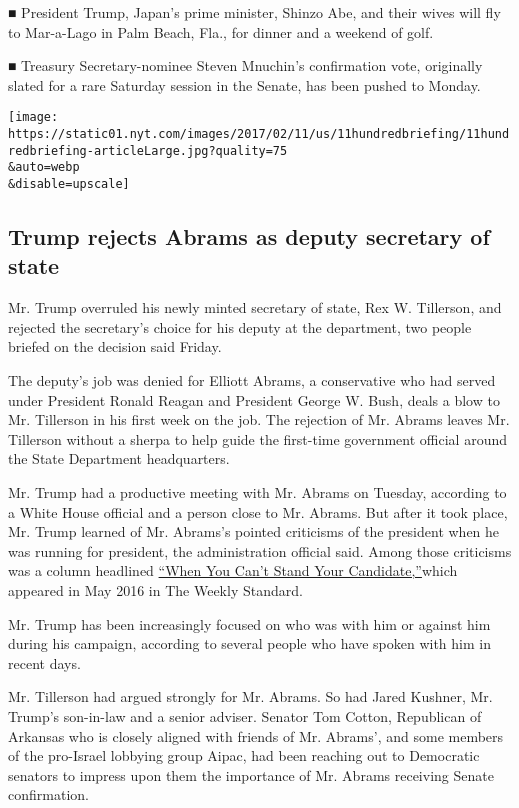 ■ President Trump, Japan's prime minister, Shinzo Abe, and their wives
will fly to Mar-a-Lago in Palm Beach, Fla., for dinner and a weekend of
golf.

■ Treasury Secretary-nominee Steven Mnuchin's confirmation vote,
originally slated for a rare Saturday session in the Senate, has been
pushed to Monday.

\texttt{[image: https://static01.nyt.com/images/2017/02/11/us/11hundredbriefing/11hundredbriefing-articleLarge.jpg?quality=75\\\&auto=webp\\\&disable=upscale]}

\hypertarget{trump-rejects-abrams-as-deputy-secretary-of-state}{%
\subsection{Trump rejects Abrams as deputy secretary of
state}\label{trump-rejects-abrams-as-deputy-secretary-of-state}}

Mr. Trump overruled his newly minted secretary of state, Rex W.
Tillerson, and rejected the secretary's choice for his deputy at the
department, two people briefed on the decision said Friday.

The deputy's job was denied for Elliott Abrams, a conservative who had
served under President Ronald Reagan and President George W. Bush, deals
a blow to Mr. Tillerson in his first week on the job. The rejection of
Mr. Abrams leaves Mr. Tillerson without a sherpa to help guide the
first-time government official around the State Department headquarters.

Mr. Trump had a productive meeting with Mr. Abrams on Tuesday, according
to a White House official and a person close to Mr. Abrams. But after it
took place, Mr. Trump learned of Mr. Abrams's pointed criticisms of the
president when he was running for president, the administration official
said. Among those criticisms was a column headlined
\href{http://www.weeklystandard.com/when-you-cant-stand-your-candidate/article/2002283}{``When
You Can't Stand Your Candidate,''}which appeared in May 2016 in The
Weekly Standard.

Mr. Trump has been increasingly focused on who was with him or against
him during his campaign, according to several people who have spoken
with him in recent days.

Mr. Tillerson had argued strongly for Mr. Abrams. So had Jared Kushner,
Mr. Trump's son-in-law and a senior adviser. Senator Tom Cotton,
Republican of Arkansas who is closely aligned with friends of Mr.
Abrams', and some members of the pro-Israel lobbying group Aipac, had
been reaching out to Democratic senators to impress upon them the
importance of Mr. Abrams receiving Senate confirmation.

